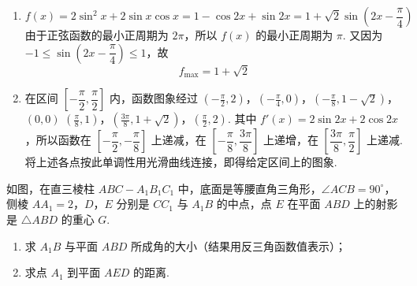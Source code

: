 \begin{solution}
\begin{enumerate}
\item
\[
f(x)=2\sin^2x+2\sin x\cos x=1-\cos2x+\sin2x=1+\sqrt2\sin\left(2x-\frac\pi4\right)
\]
由于正弦函数的最小正周期为 \(2\pi\)，所以 \(f(x)\) 的最小正周期为 \(\pi\). 又因为 \(-1\leqslant\sin\left(2x-\dfrac\pi4\right)\leqslant1\)，故
\[
f_{\max}=1+\sqrt2
\]

\item 在区间 \(\left[-\dfrac\pi2,\dfrac\pi2\right]\) 内，函数图象经过
\(\left(-\frac\pi2,2\right)\)，\(\left(-\frac\pi4,0\right)\)，\(\left(-\frac\pi8,1-\sqrt2\right)\)，\((0,0)\)
\(\left(\frac\pi8,1\right)\)，\(\left(\frac{3\pi}8,1+\sqrt2\right)\)，\(\left(\frac\pi2,2\right)\).
其中 \(f'(x)=2\sin2x+2\cos2x\)，所以函数在 \(\left[-\dfrac\pi2,-\dfrac\pi8\right]\) 上递减，在 \(\left[-\dfrac\pi8,\dfrac{3\pi}8\right]\) 上递增，在 \(\left[\dfrac{3\pi}8,\dfrac\pi2\right]\) 上递减. 将上述各点按此单调性用光滑曲线连接，即得给定区间上的图象.
\end{enumerate}
\end{solution}

\begin{problem}
如图，在直三棱柱 \(ABC - A_{1}B_{1}C_{1}\) 中，底面是等腰直角三角形，\(\angle ACB = 90^{\circ}\)，侧棱 \(AA_{1} = 2\)，\(D\)，\(E\) 分别是 \(CC_{1}\) 与 \(A_{1}B\) 的中点，点 \(E\) 在平面 \(ABD\) 上的射影是 \(\triangle ABD\) 的重心 \(G\).

\begin{enumerate}
\item 求 \(A_{1}B\) 与平面 \(ABD\) 所成角的大小（结果用反三角函数值表示）；
\item 求点 \(A_{1}\) 到平面 \(AED\) 的距离.
\end{enumerate}
\end{problem}

